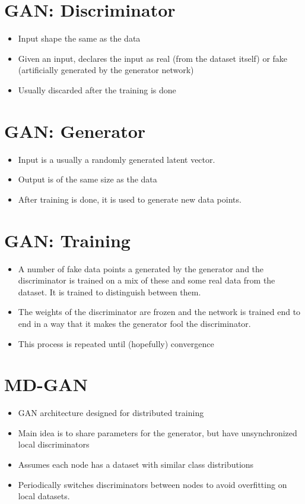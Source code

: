 \documentclass[11pt]{article}       %
\newenvironment{slide}[1]        {\section{#1} \begin{itemize}}%
                                 {\end{itemize}}
\begin{document}
\begin{slide}{GAN: Discriminator}
\item Input shape the same as the data
\item Given an input, declares the input as real (from the dataset itself) or fake (artificially generated by the generator network)
\item Usually discarded after the training is done
\end{slide}

\begin{slide}{GAN: Generator}
\item Input is a usually a randomly generated latent vector. 
\item Output is of the same size as the data
\item After training is done, it is used to generate new data points.
\end{slide}

\begin{slide}{GAN: Training}
\item A number of fake data points a generated by the generator and the discriminator is trained on a mix of these and some real data from the dataset. It is trained to distinguish between them.
\item The weights of the discriminator are frozen and the network is trained end to end in a way that it makes the generator fool the discriminator.
\item This process is repeated until (hopefully) convergence
\end{slide}


\begin{slide}{MD-GAN}
\item GAN architecture designed for distributed training
\item Main idea is to share parameters for the generator, but have unsynchronized local discriminators
\item Assumes each node has a dataset with similar class distributions
\item Periodically switches discriminators between nodes to avoid overfitting on local datasets.
\end{slide}
\end{document}
